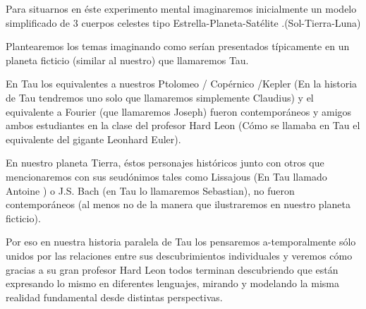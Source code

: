\documentclass[preview]{standalone}
\begin{document}
\begin{center}
Para situarnos en éste experimento mental imaginaremos inicialmente un modelo simplificado de 3 cuerpos celestes tipo Estrella-Planeta-Satélite .(Sol-Tierra-Luna) 

Plantearemos los temas imaginando como serían presentados típicamente en un planeta ficticio (similar al nuestro)  que llamaremos Tau. 

En Tau los equivalentes a nuestros Ptolomeo / Copérnico /Kepler (En la historia de Tau tendremos uno solo que llamaremos simplemente Claudius) y el equivalente a Fourier (que llamaremos Joseph) fueron contemporáneos y amigos ambos estudiantes en la clase del profesor Hard Leon  (Cómo se llamaba en Tau el equivalente del gigante Leonhard Euler). 

En nuestro planeta Tierra, éstos personajes históricos junto con otros que mencionaremos con sus seudónimos  tales como Lissajous (En Tau llamado Antoine ) o J.S. Bach (en Tau lo llamaremos Sebastian), no fueron  contemporáneos (al menos no de la manera que ilustraremos en nuestro planeta ficticio). 

Por eso en nuestra historia paralela de Tau los pensaremos a-temporalmente sólo unidos por las relaciones entre sus descubrimientos individuales  y veremos cómo gracias a su gran profesor Hard Leon todos terminan descubriendo que están expresando lo mismo en diferentes lenguajes, mirando  y modelando la misma realidad fundamental desde distintas perspectivas.
\end{center}
\end{document}
